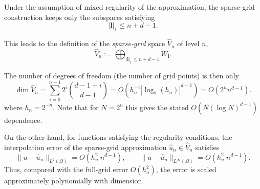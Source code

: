%
%
%

Under the assumption of mixed regularity of the approximation, the sparse-grid construction keeps only the subspaces satisfying
$$
|\mathbf{l}|_1 \le n+d-1.
$$

This leads to the definition of the \emph{sparse-grid} space $\widehat V_n$ of level $n$,
$$
\widehat V_n
:=
\bigoplus_{|\mathbf l|_1\le n+d-1} W_\mathbf{l}.
$$

The number of degrees of freedom (the number of grid points) is then only
$$
\dim \widehat V_n
=
\sum_{i=0}^{n-1} 2^i \binom{d-1+i}{d-1}
= O(h_n^{-1}|\log_2(h_n)|^{d-1})
= O(2^n n^{d-1}).
$$
where $h_n=2^{-n}$.
Note that for $N=2^n$ this gives the stated $O(N(\log{N})^{d-1})$ dependence.

On the other hand, for functions satisfying the regularity conditions,
the interpolation error of the sparse-grid approximation $\widehat u_n\in\widehat V_n$ satisfies
$$
\|u-\widehat u_n\|_{L^2(\Omega)}
=
O(h_n^2\:n^{d-1}),
\qquad
\|u-\widehat u_n\|_{L^\infty(\Omega)}
=
O(h_n^2\:n^{d-1}).
$$
Thus, compared with the full-grid error $O(h_n^2)$, the error is scaled approximately polynomially with dimension.
\cite{sg_123}

